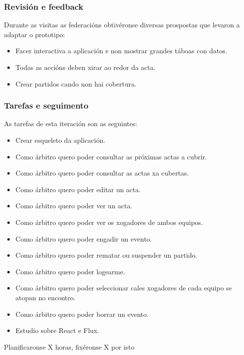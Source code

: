       \subsubsection{Revisión e feedback}
      Durante as visitas as federacións obtivéronse diversas prospostas que 
levaron a adaptar o prototipo:

      \begin{itemize}
        \item Facer interactiva a aplicación e non mostrar grandes táboas con 
datos.
        \item Todas as accións deben xirar ao redor da acta.
        \item Crear partidos cando non hai cobertura.
      \end{itemize}

      \subsubsection{Tarefas e seguimento}

      As tarefas de esta iteración son as seguintes:

      \begin{itemize}
        \item Crear esqueleto da aplicación.
        \item Como árbitro quero poder consultar as próximas actas a 
cubrir.
        \item Como árbitro quero poder consultar as actas xa cubertas.
        \item Como árbitro quero poder editar un acta.
        \item Como árbitro quero poder ver un acta.
        \item Como árbitro quero poder ver os xogadores de ambos equipos.
        \item Como árbitro quero poder engadir un evento.
        \item Como árbitro quero poder rematar ou suspender un partido.
        \item Como árbitro quero poder logearme.
        \item Como árbitro quero poder seleccionar cales xogadores de cada 
equipo se atopan no encontro.
        \item Como árbitro quero poder borrar un evento.
        \item Estudio sobre React e Flux.
       \end{itemize}

      Planificaronse X horas, fixéronse X por isto

